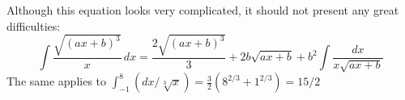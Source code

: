 \documentclass{article}
\begin{document}
Although this equation looks very complicated, it should not present
any great difficulties:
\[ \int\frac{\sqrt{(ax+b)^3}}{x}\,dx = \frac{2\sqrt{(ax+b)^3}}{3}
  + 2b\sqrt{ax+b} + b^2\int\frac{dx}{x\sqrt{ax+b}} \]
The same applies to $\int^8_{-1}(dx/\sqrt[3]{x}) = \frac{3}{2}(8^{2/3} +
  1^{2/3}) = 15/2$
\end{document}
